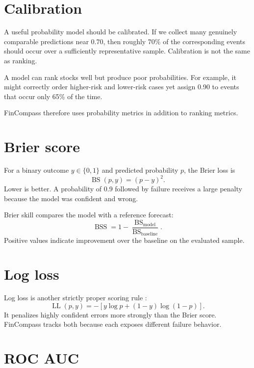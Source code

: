 \documentclass[11pt]{article}
\begin{document}
\section{Calibration}

A useful probability model should be calibrated. If we collect many genuinely comparable predictions near 0.70, then roughly 70\% of the corresponding events should occur over a sufficiently representative sample. Calibration is not the same as ranking.

A model can rank stocks well but produce poor probabilities. For example, it might correctly order higher-risk and lower-risk cases yet assign 0.90 to events that occur only 65\% of the time.

FinCompass therefore uses probability metrics in addition to ranking metrics.

\section{Brier score}

For a binary outcome $y\in\{0,1\}$ and predicted probability $p$, the Brier loss is \citep{brier1950verification}
\begin{equation}
\operatorname{BS}(p,y)=(p-y)^2.
\end{equation}
Lower is better. A probability of 0.9 followed by failure receives a large penalty because the model was confident and wrong.

Brier skill compares the model with a reference forecast:
\begin{equation}
\operatorname{BSS}=1-\frac{\operatorname{BS}_{\text{model}}}{\operatorname{BS}_{\text{baseline}}}.
\end{equation}
Positive values indicate improvement over the baseline on the evaluated sample.

\section{Log loss}

Log loss is another strictly proper scoring rule \citep{gneiting2007proper}:
\begin{equation}
\operatorname{LL}(p,y)=-\left[y\log p+(1-y)\log(1-p)\right].
\end{equation}
It penalizes highly confident errors more strongly than the Brier score. FinCompass tracks both because each exposes different failure behavior.

\section{ROC AUC}
\end{document}
